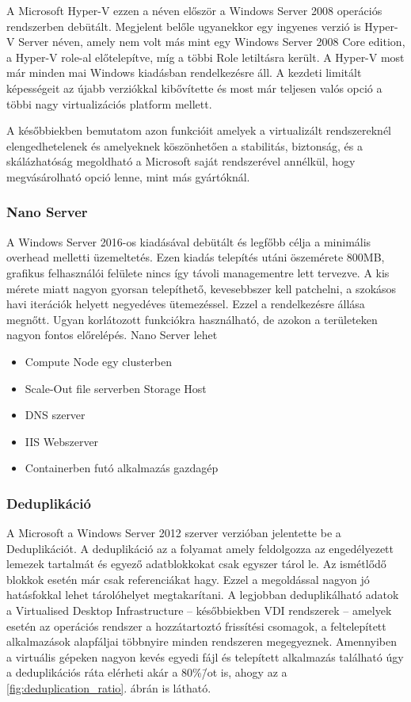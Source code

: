 \documentclass[12pt,oneside,justify,table]{book}
\begin{document}
A Microsoft Hyper-V ezzen a néven először a Windows Server 2008 operációs rendszerben debütált. 
Megjelent belőle ugyanekkor egy ingyenes verzió is Hyper-V Server néven, amely nem volt más mint egy Windows Server 2008 Core edition, a Hyper-V role-al előtelepítve, míg a többi Role letiltásra került.
A Hyper-V most már minden mai Windows kiadásban rendelkezésre áll. A kezdeti limitált képességeit az újabb verziókkal kibővítette és most már teljesen valós opció a többi nagy virtualizációs platform mellett. 

A későbbiekben bemutatom azon funkcióit amelyek a virtualizált rendszereknél elengedhetelenek és amelyeknek köszönhetően a stabilitás, biztonság, és a skálázhatóság megoldható a Microsoft saját rendszerével annélkül, hogy megvásárolható opció lenne, mint más gyártóknál.

\subsubsection{Nano Server}

A Windows Server 2016-os kiadásával debütált és legfőbb célja a minimális overhead melletti üzemeltetés. 
Ezen kiadás telepítés utáni öszemérete 800MB, grafikus felhasználói felülete nincs így távoli managementre lett tervezve.
A kis mérete miatt nagyon gyorsan telepíthető, kevesebbszer kell patchelni, a szokásos havi iterációk helyett negyedéves ütemezéssel. 
Ezzel a rendelkezésre állása megnőtt. 
Ugyan korlátozott funkciókra használható, de azokon a területeken nagyon fontos előrelépés. 
Nano Server lehet 
\begin{itemize}
	\item Compute Node egy clusterben
	\item Scale-Out file serverben Storage Host
	\item DNS szerver
	\item IIS Webszerver
	\item Containerben futó alkalmazás gazdagép
\end{itemize}

\subsubsection{Deduplikáció}

A Microsoft a Windows Server 2012 szerver verzióban jelentette be a Deduplikációt. 
A deduplikáció az a folyamat amely feldolgozza az engedélyezett lemezek tartalmát és egyező adatblokkokat csak egyszer tárol le. Az ismétlődő blokkok esetén már csak referenciákat hagy. 
Ezzel a megoldással nagyon jó hatásfokkal lehet tárolóhelyet megtakarítani. 
A legjobban deduplikálható adatok a Virtualised Desktop Infrastructure -- későbbiekben VDI rendszerek -- amelyek esetén az operációs rendszer a hozzátartoztó frissítési csomagok, a feltelepített alkalmazások alapfáljai többnyire minden rendszeren megegyeznek. 
Amennyiben a virtuális gépeken nagyon kevés egyedi fájl és telepített alkalmazás található úgy a deduplikációs ráta elérheti akár a 80\%\=/ot is, ahogy az a \ref{fig:deduplication_ratio}. ábrán is látható.
\end{document}
